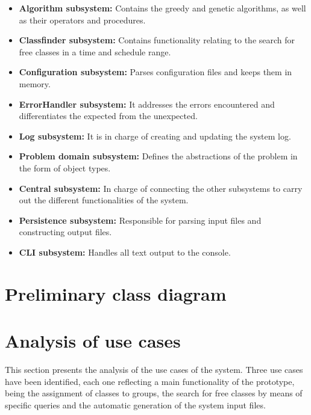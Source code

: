\begin{itemize}

    \item \textbf{Algorithm subsystem:} Contains the greedy and genetic algorithms, as well as their operators and procedures.

    \item \textbf{Classfinder subsystem:} Contains functionality relating to the search for free classes in a time and schedule range.

    \item \textbf{Configuration subsystem:} Parses configuration files and keeps them in memory.

    \item \textbf{ErrorHandler subsystem:} It addresses the errors encountered and differentiates the expected from the unexpected.

    \item \textbf{Log subsystem:} It is in charge of creating and updating the system log.

    \item \textbf{Problem domain subsystem:} Defines the abstractions of the problem in the form of object types.

    \item \textbf{Central subsystem:} In charge of connecting the other subsystems to carry out the different functionalities of the system.

    \item \textbf{Persistence subsystem:} Responsible for parsing input files and constructing output files.

    \item \textbf{CLI subsystem:} Handles all text output to the console.

\end{itemize}



\section{Preliminary class diagram}



\section{Analysis of use cases}

This section presents the analysis of the use cases of the system. Three use cases have been identified, each one reflecting a main functionality of the prototype, being the assignment of classes to groups, the search for free classes by means of specific queries and the automatic generation of the system input files.


